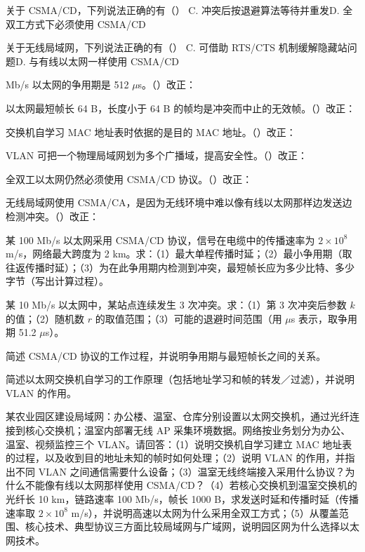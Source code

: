 \documentclass[a4paper,11pt]{article}
\begin{document}
\q 关于 CSMA/CD，下列说法正确的有（\quad）
{C. 冲突后按退避算法等待并重发}{D. 全双工方式下必须使用 CSMA/CD}

\q 关于无线局域网，下列说法正确的有（\quad）
{C. 可借助 RTS/CTS 机制缓解隐藏站问题}{D. 与有线以太网一样使用 CSMA/CD}

 Mb/s 以太网的争用期是 512 $\mu$s。\quad（\quad）\quad 改正：\fixblank

\q 以太网最短帧长 64 B，长度小于 64 B 的帧均是冲突而中止的无效帧。\quad（\quad）\quad 改正：\fixblank

\q 交换机自学习 MAC 地址表时依据的是目的 MAC 地址。\quad（\quad）\quad 改正：\fixblank

\q VLAN 可把一个物理局域网划为多个广播域，提高安全性。\quad（\quad）\quad 改正：\fixblank

\q 全双工以太网仍然必须使用 CSMA/CD 协议。\quad（\quad）\quad 改正：\fixblank

 无线局域网使用 CSMA/CA，是因为无线环境中难以像有线以太网那样边发送边检测冲突。\quad（\quad）\quad 改正：\fixblank

\q 某 100 Mb/s 以太网采用 CSMA/CD 协议，信号在电缆中的传播速率为 $2\times10^{8}$ m/s，网络最大跨度为 2 km。求：（1）最大单程传播时延；（2）最小争用期（取往返传播时延）；（3）为在此争用期内检测到冲突，最短帧长应为多少比特、多少字节（写出计算过程）。

\q 某 10 Mb/s 以太网中，某站点连续发生 3 次冲突。求：（1）第 3 次冲突后参数 $k$ 的值；（2）随机数 $r$ 的取值范围；（3）可能的退避时间范围（用 $\mu$s 表示，取争用期 51.2 $\mu$s）。

\q 简述 CSMA/CD 协议的工作过程，并说明争用期与最短帧长之间的关系。\anslines{2.4cm}

\q 简述以太网交换机自学习的工作原理（包括地址学习和帧的转发／过滤），并说明 VLAN 的作用。\anslines{2.4cm}

\newpage
{}
\q 某农业园区建设局域网：办公楼、温室、仓库分别设置以太网交换机，通过光纤连接到核心交换机；温室内部署无线 AP 采集环境数据。网络按业务划分为办公、温室、视频监控三个 VLAN。请回答：（1）说明交换机自学习建立 MAC 地址表的过程，以及收到目的地址未知的帧时如何处理；（2）说明 VLAN 的作用，并指出不同 VLAN 之间通信需要什么设备；（3）温室无线终端接入采用什么协议？为什么不能像有线以太网那样使用 CSMA/CD？（4）若核心交换机到温室交换机的光纤长 10 km，链路速率 100 Mb/s，帧长 1000 B，求发送时延和传播时延（传播速率取 $2\times10^{8}$ m/s），并说明高速以太网为什么采用全双工方式；（5）从覆盖范围、核心技术、典型协议三方面比较局域网与广域网，说明园区网为什么选择以太网技术。\anslines{5cm}
\end{document}
